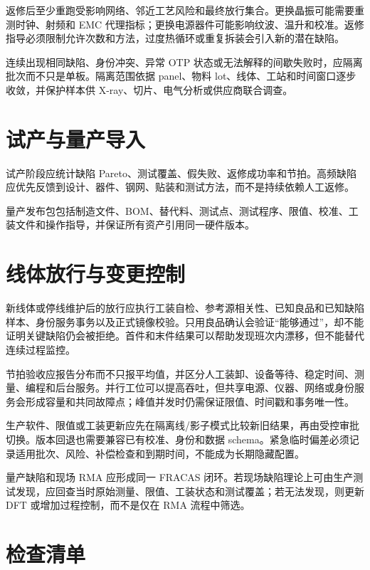 返修后至少重跑受影响网络、邻近工艺风险和最终放行集合。更换晶振可能需要重测时钟、射频和 EMC 代理指标；更换电源器件可能影响纹波、温升和校准。返修指导必须限制允许次数和方法，过度热循环或重复拆装会引入新的潜在缺陷。

连续出现相同缺陷、身份冲突、异常 OTP 状态或无法解释的间歇失败时，应隔离批次而不只是单板。隔离范围依据 panel、物料 lot、线体、工站和时间窗口逐步收敛，并保护样本供 X-ray、切片、电气分析或供应商联合调查。

\section{试产与量产导入}

试产阶段应统计缺陷 Pareto、测试覆盖、假失败、返修成功率和节拍。高频缺陷应优先反馈到设计、器件、钢网、贴装和测试方法，而不是持续依赖人工返修。

量产发布包包括制造文件、BOM、替代料、测试点、测试程序、限值、校准、工装文件和操作指导，并保证所有资产引用同一硬件版本。

\section{线体放行与变更控制}

新线体或停线维护后的放行应执行工装自检、参考源相关性、已知良品和已知缺陷样本、身份服务事务以及正式镜像校验。只用良品确认会验证“能够通过”，却不能证明关键缺陷仍会被拒绝。首件和末件结果可以帮助发现班次内漂移，但不能替代连续过程监控。

节拍验收应报告分布而不只报平均值，并区分人工装卸、设备等待、稳定时间、测量、编程和后台服务。并行工位可以提高吞吐，但共享电源、仪器、网络或身份服务会形成容量和共同故障点；峰值并发时仍需保证限值、时间戳和事务唯一性。

生产软件、限值或工装更新应先在隔离线/影子模式比较新旧结果，再由受控审批切换。版本回退也需要兼容已有校准、身份和数据 schema。紧急临时偏差必须记录适用批次、风险、补偿检查和到期时间，不能成为长期隐藏配置。

量产缺陷和现场 RMA 应形成同一 FRACAS 闭环。若现场缺陷理论上可由生产测试发现，应回查当时原始测量、限值、工装状态和测试覆盖；若无法发现，则更新 DFT 或增加过程控制，而不是仅在 RMA 流程中筛选。

\section{检查清单}

